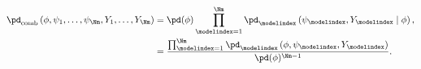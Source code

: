 \begin{equation}
  \begin{aligned}
    \pd_{\text{comb}}\left(\phi, \psi_{1}, \ldots, \psi_{\Nm}, Y_{1}, \ldots, Y_{\Nm}\right)
    &= \pd(\phi) \prod_{\modelindex = 1}^{\Nm} \pd_{\modelindex}\left(\psi_{\modelindex}, Y_{\modelindex} \mid \phi\right), \\
    &= \frac{\prod_{\modelindex = 1}^{\Nm} \pd_{\modelindex}\left(\phi, \psi_{\modelindex}, Y_{\modelindex}\right)}{\pd(\phi)^{\Nm - 1}}.
  \end{aligned}
  \label{eqn:markov-combination}
\end{equation}